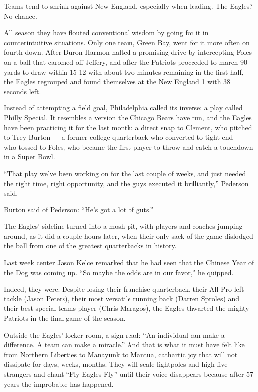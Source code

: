 Teams tend to shrink against New England, especially when leading. The
Eagles? No chance.

All season they have flouted conventional wisdom by
\href{https://www.nytimes3xbfgragh.onion/2018/02/02/sports/football/eagles-analytics-super-bowl-lii.html}{going
for it in counterintuitive situations}. Only one team, Green Bay, went
for it more often on fourth down. After Duron Harmon halted a promising
drive by intercepting Foles on a ball that caromed off Jeffery, and
after the Patriots proceeded to march 90 yards to draw within 15-12 with
about two minutes remaining in the first half, the Eagles regrouped and
found themselves at the New England 1 with 38 seconds left.

Instead of attempting a field goal, Philadelphia called its inverse:
\href{https://www.nytimes3xbfgragh.onion/2018/02/05/sports/foles-super-bowl.html?ribbon-ad-idx=3\&rref=sports\&module=Ribbon\&version=context\&region=Header\&action=click\&contentCollection=Sports\&pgtype=article}{a
play called Philly Special}. It resembles a version the Chicago Bears
have run, and the Eagles have been practicing it for the last month: a
direct snap to Clement, who pitched to Trey Burton --- a former college
quarterback who converted to tight end --- who tossed to Foles, who
became the first player to throw and catch a touchdown in a Super Bowl.

``That play we've been working on for the last couple of weeks, and just
needed the right time, right opportunity, and the guys executed it
brilliantly,'' Pederson said.

Burton said of Pederson: ``He's got a lot of guts.''

The Eagles' sideline turned into a mosh pit, with players and coaches
jumping around, as it did a couple hours later, when their only sack of
the game dislodged the ball from one of the greatest quarterbacks in
history.

Last week center Jason Kelce remarked that he had seen that the Chinese
Year of the Dog was coming up. ``So maybe the odds are in our favor,''
he quipped.

Indeed, they were. Despite losing their franchise quarterback, their
All-Pro left tackle (Jason Peters), their most versatile running back
(Darren Sproles) and their best special-teams player (Chris Maragos),
the Eagles thwarted the mighty Patriots in the final game of the season.

Outside the Eagles' locker room, a sign read: ``An individual can make a
difference. A team can make a miracle.'' And that is what it must have
felt like from Northern Liberties to Manayunk to Mantua, cathartic joy
that will not dissipate for days, weeks, months. They will scale
lightpoles and high-five strangers and chant ``Fly Eagles Fly'' until
their voice disappears because after 57 years the improbable has
happened.

